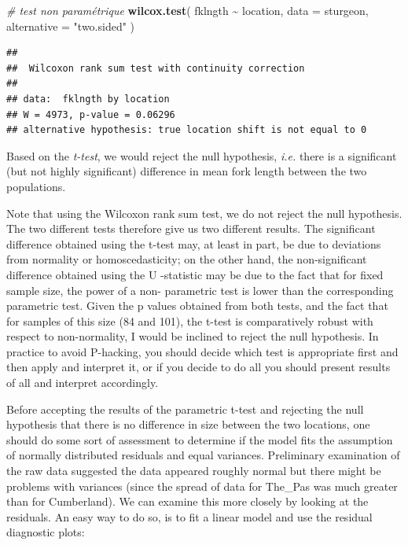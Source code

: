 \documentclass[
  12pt,
]{book}
\newenvironment{Shaded}{\begin{snugshade}}{\end{snugshade}}
\newcommand{\CommentTok}[1]{\textcolor[rgb]{0.56,0.35,0.01}{\textit{#1}}}
\newcommand{\DataTypeTok}[1]{\textcolor[rgb]{0.13,0.29,0.53}{#1}}
\newcommand{\KeywordTok}[1]{\textcolor[rgb]{0.13,0.29,0.53}{\textbf{#1}}}
\newcommand{\NormalTok}[1]{#1}
\newcommand{\OperatorTok}[1]{\textcolor[rgb]{0.81,0.36,0.00}{\textbf{#1}}}
\newcommand{\StringTok}[1]{\textcolor[rgb]{0.31,0.60,0.02}{#1}}
\begin{document}
\begin{Shaded}
\begin{Highlighting}[]
\CommentTok{\# test non paramétrique}
\KeywordTok{wilcox.test}\NormalTok{(}
\NormalTok{  fklngth }\OperatorTok{\textasciitilde{}}\StringTok{ }\NormalTok{location,}
  \DataTypeTok{data =}\NormalTok{ sturgeon,}
  \DataTypeTok{alternative =} \StringTok{"two.sided"}
\NormalTok{)}
\end{Highlighting}
\end{Shaded}

\begin{verbatim}
## 
##  Wilcoxon rank sum test with continuity correction
## 
## data:  fklngth by location
## W = 4973, p-value = 0.06296
## alternative hypothesis: true location shift is not equal to 0
\end{verbatim}

Based on the \emph{t-test}, we would reject the null hypothesis, \emph{i.e.} there is a significant (but not highly significant) difference in mean fork length between the two populations.

Note that using the Wilcoxon rank sum test, we do not reject the null hypothesis. The two different tests therefore give us two different results. The significant difference obtained using the t-test may, at least in part, be due to deviations from normality or homoscedasticity; on the other hand, the non-significant difference obtained using the U -statistic may be due to the fact that for fixed sample size, the power of a non- parametric test is lower than the corresponding parametric test. Given the p values obtained from both tests, and the fact that for samples of this size (84 and 101), the t-test is comparatively robust with respect to non-normality, I would be inclined to reject the null hypothesis. In practice to avoid P-hacking, you should decide which test is appropriate first and then apply and interpret it, or if you decide to do all you should present results of all and interpret accordingly.

Before accepting the results of the parametric t-test and rejecting the null hypothesis that there is no difference in size between the two locations, one should do some sort of assessment to determine if the model fits the assumption of normally distributed residuals and equal variances. Preliminary examination of the raw data suggested the data appeared roughly normal but there might be problems with variances (since the spread of data for The\_Pas was much greater than for Cumberland). We can examine this more closely by looking at the residuals. An easy way to do so, is to fit a linear model and use the residual diagnostic plots:
\end{document}
